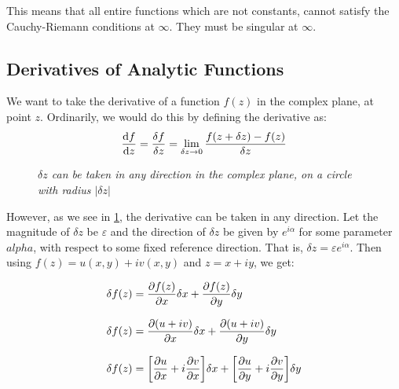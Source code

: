 \documentclass[12pt, letterpaper]{book}
\begin{document}
This means that all entire functions which are not constants, cannot satisfy the Cauchy-Riemann conditions at $\infty$. They must be singular at $\infty$. 


\subsection{Derivatives of Analytic Functions}

We want to take the derivative of a function $f(z)$ in the complex plane, at point $z$. Ordinarily, we would do this by defining the derivative as: 
$$\dv{f}{z}= \frac{\delta f}{\delta z}= \lim_{\delta z \rightarrow 0} \frac{f(z+\delta z)- f(z)}{\delta z}$$

\begin{figure}
    \begin{center}
        \caption{\emph{$\delta z$ can be taken in any direction in the complex plane, on a circle with radius $|\delta z|$}}\label{derivative}        
    \end{center}
\end{figure}


However, as we see in \cref{derivative}, the derivative can be taken in any direction. Let the magnitude of $\delta z$ be $\varepsilon$ and the direction of $\delta z$ be given by $e^{i\alpha}$ for some parameter $alpha$, with respect to some fixed reference direction. That is, $\delta z= \varepsilon e^{i\alpha}$. Then using $f(z) = u(x, y)+ i v(x, y)$ and $z= x+iy$, we get: 

\begin{equation*}
\setlength{\jot}{10pt}
   \begin{aligned}
        \delta f(z)&= \pdv{f(z)}{x}\delta x+ \pdv{f(z)}{y}\delta y\\
        \delta f(z) &= \pdv{(u+iv)}{x}\delta x +\pdv{(u+iv)}{y}\delta y\\
        \delta f(z) &= \qty[\pdv{u}{x}+i\pdv{v}{x}]\delta x +\qty[\pdv{u}{y}+i\pdv{v}{y}]\delta y
   \end{aligned} 
\end{equation*}
\end{document}
